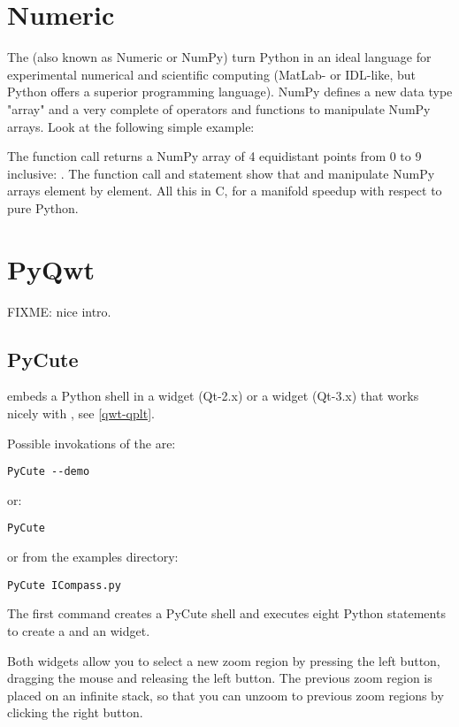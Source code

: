 \documentclass{manual}
\begin{document}
\section{Numeric \label{numeric-intro}}

The 
(also known as Numeric or NumPy) turn Python in an ideal language for
experimental numerical and scientific computing (MatLab- or IDL-like,
but Python offers a superior programming language).
NumPy defines a new data type "array" and a very complete of operators and
functions to manipulate NumPy arrays.
Look at the following simple example:



The function call  returns a NumPy array of 4
equidistant points from 0 to 9 inclusive: .
The function call  and statement  show that
 and \samp{*} manipulate NumPy arrays element by element.
All this in C, for a manifold speedup with respect to pure Python.


\section{PyQwt \label{pyqwt-intro}}

FIXME: nice intro.


\subsection{PyCute \label{pycute-intro}}

 embeds a Python shell in a  widget
(Qt-2.x) or a  widget (Qt-3.x) that works nicely with
, see \ref{qwt-qplt}.

Possible invokations of the  are:
\begin{verbatim}
PyCute --demo
\end{verbatim}
or:
\begin{verbatim}
PyCute
\end{verbatim}
or from the examples directory:
\begin{verbatim}
PyCute ICompass.py
\end{verbatim}

The first command creates a PyCute shell and executes eight Python statements
to create a  and an  widget.

Both widgets allow you to select a new zoom region by pressing the left button,
dragging the mouse and releasing the left button.
The previous zoom region is placed on an infinite stack, so that you can
unzoom to previous zoom regions by clicking the right button.
\end{document}

